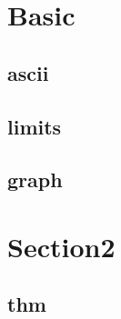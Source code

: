 \section{Basic}
    \subsection{ascii}
        
    \subsection{limits}
            
    \subsection{graph}
        
 
\section{Section2}
    \subsection{thm}
        